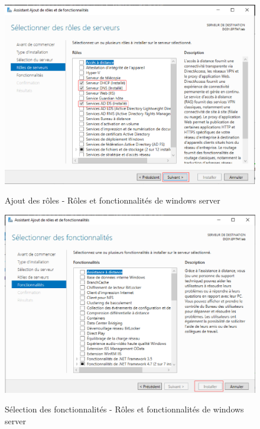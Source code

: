 \begin{figure}[h!]
	\begin{center}
		\caption{Ajout des rôles - Rôles et fonctionnalités de windows server}
		\includegraphics[scale=0.7]{WS_Screenshots/33.png}
		\label{Funcs_WinS/5}
	\end{center}
\end{figure}
\FloatBarrier 
    

\begin{figure}[h!]
	\begin{center}
		\caption{Sélection des fonctionnalités - Rôles et fonctionnalités de windows server}
		\includegraphics[scale=0.5]{WS_Screenshots/34.png}
		\label{Funcs_WinS/6}
	\end{center}
\end{figure}
\FloatBarrier 
    
